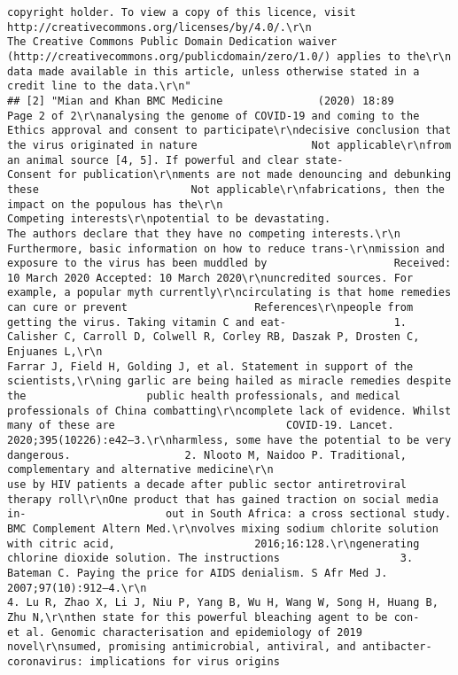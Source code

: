 \documentclass[
]{book}
\begin{document}
\begin{verbatim}
copyright holder. To view a copy of this licence, visit http://creativecommons.org/licenses/by/4.0/.\r\n                                      The Creative Commons Public Domain Dedication waiver (http://creativecommons.org/publicdomain/zero/1.0/) applies to the\r\n                                      data made available in this article, unless otherwise stated in a credit line to the data.\r\n"
## [2] "Mian and Khan BMC Medicine               (2020) 18:89                                                                                            Page 2 of 2\r\nanalysing the genome of COVID-19 and coming to the                       Ethics approval and consent to participate\r\ndecisive conclusion that the virus originated in nature                  Not applicable\r\nfrom an animal source [4, 5]. If powerful and clear state-               Consent for publication\r\nments are not made denouncing and debunking these                        Not applicable\r\nfabrications, then the impact on the populous has the\r\n                                                                         Competing interests\r\npotential to be devastating.                                             The authors declare that they have no competing interests.\r\n   Furthermore, basic information on how to reduce trans-\r\nmission and exposure to the virus has been muddled by                    Received: 10 March 2020 Accepted: 10 March 2020\r\nuncredited sources. For example, a popular myth currently\r\ncirculating is that home remedies can cure or prevent                    References\r\npeople from getting the virus. Taking vitamin C and eat-                 1. Calisher C, Carroll D, Colwell R, Corley RB, Daszak P, Drosten C, Enjuanes L,\r\n                                                                              Farrar J, Field H, Golding J, et al. Statement in support of the scientists,\r\ning garlic are being hailed as miracle remedies despite the                   public health professionals, and medical professionals of China combatting\r\ncomplete lack of evidence. Whilst many of these are                           COVID-19. Lancet. 2020;395(10226):e42–3.\r\nharmless, some have the potential to be very dangerous.                  2. Nlooto M, Naidoo P. Traditional, complementary and alternative medicine\r\n                                                                              use by HIV patients a decade after public sector antiretroviral therapy roll\r\nOne product that has gained traction on social media in-                      out in South Africa: a cross sectional study. BMC Complement Altern Med.\r\nvolves mixing sodium chlorite solution with citric acid,                      2016;16:128.\r\ngenerating chlorine dioxide solution. The instructions                   3. Bateman C. Paying the price for AIDS denialism. S Afr Med J. 2007;97(10):912–4.\r\n                                                                         4. Lu R, Zhao X, Li J, Niu P, Yang B, Wu H, Wang W, Song H, Huang B, Zhu N,\r\nthen state for this powerful bleaching agent to be con-                       et al. Genomic characterisation and epidemiology of 2019 novel\r\nsumed, promising antimicrobial, antiviral, and antibacter-                    coronavirus: implications for virus origins 
\end{verbatim}
\end{document}
